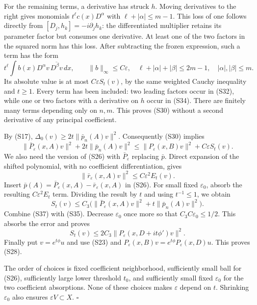 \documentclass[
  11pt,
]{article}
\begin{document}
For the remaining terms, a derivative has struck \(h\). Moving
derivatives to the right gives monomials \(t^\ell c(x)D^\alpha\) with
\(\ell+|\alpha|\leq m-1\). This loss of one follows directly from
\([D_j,h_k]=-i\partial_jh_k\): the differentiated multiplier retains its
parameter factor but consumes one derivative. At least one of the two
factors in the squared norm has this loss. After subtracting the frozen
expression, such a term has the form \[
 t^\ell\int b(x)D^\alpha v\,\overline{D^\beta v}\,dx,\qquad
 \|b\|_\infty\leq C\varepsilon,\quad
 \ell+|\alpha|+|\beta|\leq2m-1,\quad |\alpha|,|\beta|\leq m.         \tag{S34}
\] Its absolute value is at most \(C\varepsilon S_t(v)\), by the same
weighted Cauchy inequality and \(t\geq1\). Every term has been included:
two leading factors occur in (S32), while one or two factors with a
derivative on \(h\) occur in (S34). There are finitely many terms
depending only on \(n,m\). This proves (S30) without a second derivative
of any principal coefficient.

By (S17), \(\Delta_0(v)\geq2t\|\bar p_n(A)v\|^2\). Consequently (S30)
implies \[
 \|\bar P_\varepsilon(x,A)v\|^2+
       2t\|\bar p_n(A)v\|^2
 \leq\|P_\varepsilon(x,B)v\|^2+C\varepsilon S_t(v).               \tag{S35}
\] We also need the version of (S26) with \(\bar P_\varepsilon\)
replacing \(\bar p\). Direct expansion of the shifted polynomial, with
no coefficient differentiation, gives \[
 \|\bar r_\varepsilon(x,A)v\|^2\leq C\varepsilon^2 E_t(v).         \tag{S36}
\] Insert \(\bar p(A)=\bar P_\varepsilon(x,A)-\bar r_\varepsilon(x,A)\)
in (S26). For small fixed \(\varepsilon_0\), absorb the resulting
\(C\varepsilon^2E_t\) term. Dividing the result by \(t\) and using
\(t^{-1}\leq1\), we obtain \[
 S_t(v)\leq C_3\bigl(\|\bar P_\varepsilon(x,A)v\|^2+
                         t\|\bar p_n(A)v\|^2\bigr).              \tag{S37}
\] Combine (S37) with (S35). Decrease \(\varepsilon_0\) once more so
that \(C_3C\varepsilon_0\leq1/2\). This absorbs the error and proves \[
 S_t(v)\leq 2C_3\|P_\varepsilon(x,D+it\phi')v\|^2.                \tag{S38}
\] Finally put \(v=e^{t\phi}u\) and use (S23) and
\(P_\varepsilon(x,B)v=e^{t\phi}P_\varepsilon(x,D)u\). This proves (S28).

The order of choices is fixed coefficient neighborhood, sufficiently
small ball for (S26), sufficiently large lower threshold \(t_0\), and
sufficiently small fixed \(\varepsilon_0\) for the two coefficient
absorptions. None of these choices makes \(\varepsilon\) depend on
\(t\). Shrinking \(\varepsilon_0\) also ensures
\(\varepsilon V\subset X\). \(\square\)
\end{document}
